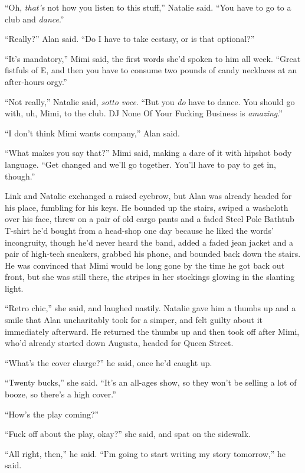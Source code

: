 ``Oh, \textit{that's} not how you listen to this stuff,'' Natalie
said.  ``You have to go to a club and \textit{dance}.''

``Really?'' Alan said.  ``Do I have to take ecstasy, or is that
optional?''

``It's mandatory,'' Mimi said, the first words she'd spoken to him all
week.  ``Great fistfuls of E, and then you have to consume two pounds
of candy necklaces at an after-hours orgy.''

``Not really,'' Natalie said, \textit{sotto voce}.  ``But you
\textit{do} have to dance.  You should go with, uh, Mimi, to the club. 
DJ None Of Your Fucking Business is \textit{amazing}.''

``I don't think Mimi wants company,'' Alan said.

``What makes you say that?'' Mimi said, making a dare of it with
hipshot body language.  ``Get changed and we'll go together.  You'll
have to pay to get in, though.''

Link and Natalie exchanged a raised eyebrow, but Alan was already
headed for his place, fumbling for his keys.  He bounded up the
stairs, swiped a washcloth over his face, threw on a pair of old cargo
pants and a faded Steel Pole Bathtub T-shirt he'd bought from a
head-shop one day because he liked the words' incongruity, though he'd
never heard the band, added a faded jean jacket and a pair of
high-tech sneakers, grabbed his phone, and bounded back down the
stairs.  He was convinced that Mimi would be long gone by the time he
got back out front, but she was still there, the stripes in her
stockings glowing in the slanting light.

``Retro chic,'' she said, and laughed nastily.  Natalie gave him a
thumbs up and a smile that Alan uncharitably took for a simper, and
felt guilty about it immediately afterward.  He returned the thumbs up
and then took off after Mimi, who'd already started down Augusta,
headed for Queen Street.

``What's the cover charge?'' he said, once he'd caught up.

``Twenty bucks,'' she said.  ``It's an all-ages show, so they won't be
selling a lot of booze, so there's a high cover.''

``How's the play coming?''

``Fuck off about the play, okay?'' she said, and spat on the sidewalk.

``All right, then,'' he said.  ``I'm going to start writing my story
tomorrow,'' he said.

